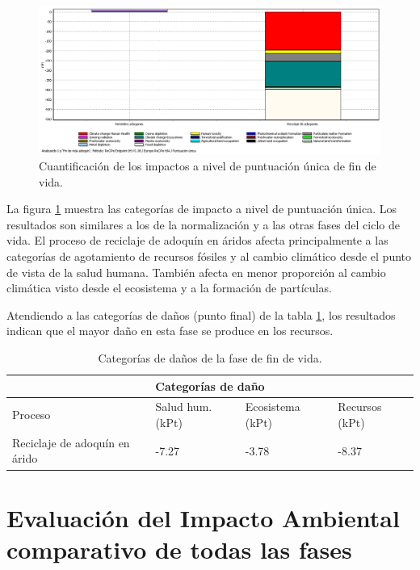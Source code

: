 \begin{figure}[!htb]
\centering
\includegraphics[width=15cm]{img/fdv_puntuacionunica.png}
\caption{Cuantificación de los impactos a nivel de puntuación única de fin de vida.}
\label{fig:fdv_puntuacionunica}
\end{figure}

La figura \ref{fig:fdv_puntuacionunica} muestra las categorías de impacto a nivel de puntuación única. Los resultados son similares a los de la normalización y a las otras fases del ciclo de vida. El proceso de reciclaje de adoquín en áridos afecta principalmente a las categorías de agotamiento de recursos fósiles y al cambio climático desde el punto de vista de la salud humana. También afecta en menor proporción al cambio climática visto desde el ecosistema y a la formación de partículas.

Atendiendo a las categorías de daños (punto final) de la tabla \ref{categoriasdanosfdv}, los resultados indican que el mayor daño en esta fase se produce en los recursos.

\begin{table}[!htb]
\centering
\begin{tabular}{p{6cm}p{2cm}p{2cm}p{2cm}}
\toprule
\multicolumn{4}{c}{Categorías de daño}\\
\midrule
Proceso & Salud hum. (kPt) & Ecosistema (kPt) & Recursos (kPt)\\
\midrule
Reciclaje de adoquín en árido & -7.27 & -3.78 & -8.37\\
\bottomrule
\end{tabular}
\caption{Categorías de daños de la fase de fin de vida.}
\label{categoriasdanosfdv}
\end{table}

\section{Evaluación del Impacto Ambiental comparativo de todas las fases}

